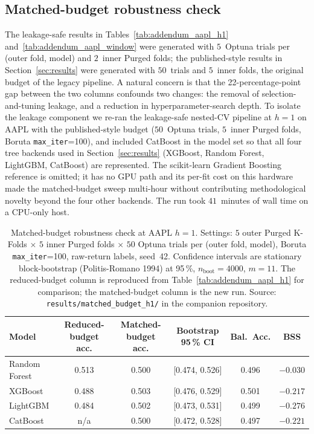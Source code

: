 \documentclass{rQUF2e}
\begin{document}
\subsection{Matched-budget robustness check}
\label{sec:addendum_caveats}

The leakage-safe results in
Tables~\ref{tab:addendum_aapl_h1} and~\ref{tab:addendum_aapl_window}
were generated with $5$~Optuna trials per (outer fold, model)
and $2$~inner Purged folds; the published-style results in
Section~\ref{sec:results} were generated with $50$~trials and
$5$~inner folds, the original budget of the legacy pipeline.
A natural concern is that the 22-percentage-point gap between
the two columns confounds two changes: the removal of
selection-and-tuning leakage, and a reduction in
hyperparameter-search depth. To isolate the leakage component
we re-ran the leakage-safe nested-CV pipeline at $h=1$ on AAPL
with the published-style budget ($50$~Optuna trials,
$5$~inner Purged folds, Boruta \texttt{max\_iter}=100), and
included CatBoost in the model set so that all four tree
backends used in Section~\ref{sec:results} (XGBoost, Random
Forest, LightGBM, CatBoost) are represented. The
scikit-learn Gradient Boosting reference is omitted; it has
no GPU path and its per-fit cost on this hardware made the
matched-budget sweep multi-hour without contributing
methodological novelty beyond the four other backends. The run
took $41$~minutes of wall time on a CPU-only host.

\begin{table}[H]
\centering
\caption{Matched-budget robustness check at AAPL $h=1$.
Settings: $5$ outer Purged K-Folds $\times$ $5$ inner Purged
folds $\times$ $50$ Optuna trials per (outer fold, model),
Boruta \texttt{max\_iter}=100, raw-return labels, seed~42.
Confidence intervals are stationary block-bootstrap
(Politis-Romano 1994) at 95\,\%, $n_{\text{boot}}=4000$,
$m=11$. The reduced-budget column is reproduced from
Table~\ref{tab:addendum_aapl_h1} for comparison; the
matched-budget column is the new run. Source:
\texttt{results/matched\_budget\_h1/} in the companion
repository.}
\label{tab:addendum_matched_budget}
\scriptsize
\begin{tabular}{lccccc}
\toprule
\textbf{Model} & \textbf{Reduced-budget acc.} & \textbf{Matched-budget acc.} & \textbf{Bootstrap 95\,\% CI} & \textbf{Bal.\ Acc.} & \textbf{BSS} \\
\midrule
Random Forest & 0.513 & 0.500 & [0.474, 0.526] & 0.496 & $-0.030$ \\
XGBoost       & 0.488 & 0.503 & [0.476, 0.529] & 0.501 & $-0.217$ \\
LightGBM      & 0.484 & 0.502 & [0.473, 0.531] & 0.499 & $-0.276$ \\
CatBoost      & n/a   & 0.500 & [0.472, 0.528] & 0.497 & $-0.221$ \\
\bottomrule
\end{tabular}
\end{table}
\end{document}
